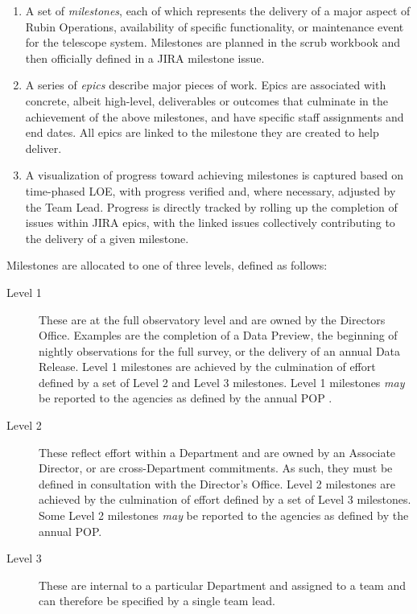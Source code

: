 \begin{enumerate}
    \item A set of \emph{milestones}, each of which represents the delivery of a major aspect of \gls{Rubin Operations}, availability of specific functionality, or maintenance event for the telescope system.
        Milestones are planned in the scrub workbook and then officially defined in a \gls{JIRA} milestone issue.
    \item A series of \emph{epics} describe major pieces of work.
        Epics are associated with concrete, albeit high-level, deliverables or outcomes that culminate in the achievement of the above milestones, and have specific staff assignments and end dates.
        All epics are linked to the milestone they are created to help deliver.
    \item A visualization of progress toward achieving milestones is captured based on time-phased \gls{LOE}, with progress verified and, where necessary, adjusted by the Team Lead. Progress is directly tracked by rolling up the completion of issues within \gls{JIRA} epics, with the linked issues collectively contributing to the delivery of a given milestone.
\end{enumerate}

Milestones are allocated to one of three levels, defined as follows:

\begin{description}
\item[Level 1] These are at the full observatory level and are owned by the Directors Office.
Examples are the completion of a Data Preview, the beginning of nightly observations for the full survey, or the delivery of an annual \gls{Data Release}.
Level 1 milestones are achieved by the culmination of effort defined by a set of Level 2 and Level 3 milestones.
Level 1 milestones {\it may} be reported to the agencies as defined by the annual \gls{POP} .
\item[Level 2] These reflect effort within a Department and are owned by an Associate \gls{Director}, or are cross-Department commitments.
As such, they must be defined in consultation with the \gls{Director}'s Office.
Level 2 milestones are achieved by the culmination of effort defined by a set of Level 3 milestones.
Some Level 2 milestones {\it may} be reported to the agencies as defined by the annual \gls{POP}.
\item[Level 3] These are internal to a particular Department and assigned to a team and can therefore be specified by a single team lead.
\end{description}

